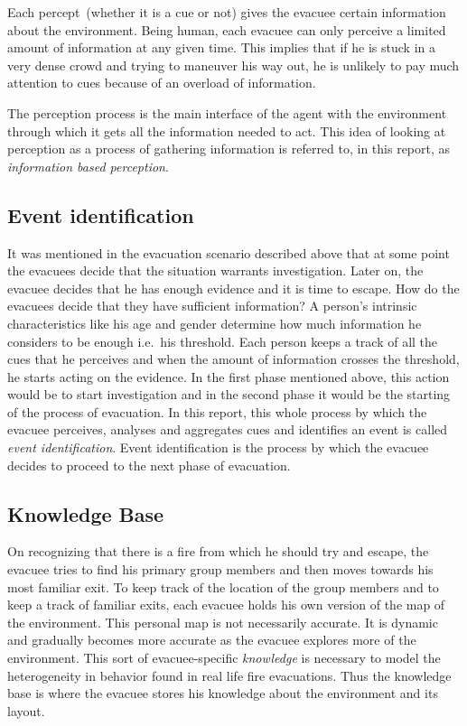 	Each percept~(whether it is a cue or not) gives the evacuee certain information about the environment. Being human, each evacuee can only perceive a limited amount of information at any given time. This implies that if he is stuck in a very dense crowd and trying to maneuver his way out, he is unlikely to pay much attention to cues because of an overload of information. 

	The perception process is the main interface of the agent with the environment through which it gets all the information needed to act. This idea of looking at perception as a process of gathering information is referred to, in this report, as \emph{information based perception}.

\subsection{Event identification} %
\label{IBEVAC:EventIdentification}
	It was mentioned in the evacuation scenario described above that at some point the evacuees decide that the situation warrants investigation. Later on, the evacuee decides that he has enough evidence and it is time to escape. How do the evacuees decide that they have sufficient information? A person's intrinsic characteristics like his age and gender determine how much information he considers to be enough i.e.\ his threshold. Each person keeps a track of all the cues that he perceives and when the amount of information crosses the threshold, he starts acting on the evidence. In the first phase mentioned above, this action would be to start investigation and in the second phase it would be the starting of the process of evacuation. In this report, this whole process by which the evacuee perceives, analyses and aggregates cues and identifies an event is called \emph{event identification}. Event identification is the process by which the evacuee decides to proceed to the next phase of evacuation.

\subsection{Knowledge Base}
\label{IBEVAC:Knowledge}
	On recognizing that there is a fire from which he should try and escape, the evacuee tries to find his primary group members and then moves towards his most familiar exit. To keep track of the location of the group members and to keep a track of familiar exits, each evacuee holds his own version of the map of the environment. This personal map is not necessarily accurate. It is dynamic and gradually becomes more accurate as the evacuee explores more of the environment. This sort of evacuee-specific \emph{knowledge} is necessary to model the heterogeneity in behavior found in real life fire evacuations. Thus the knowledge base is where the evacuee stores his knowledge about the environment and its layout.

